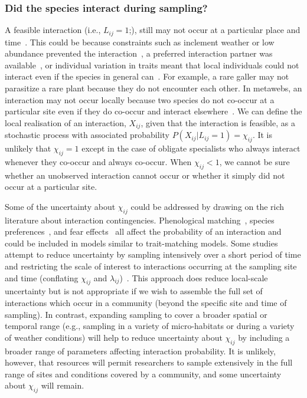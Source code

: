 \documentclass[12pt]{article}
\begin{document}
\begin{spacing}{2.0}
        \subsubsection*{Did the species interact during sampling?} 

          A feasible interaction (i.e., $L_{ij}=1$;), still may not occur at a particular place and time~\citep{Poisot2015,Graham2018}. This could be because constraints such as inclement weather or low abundance prevented the interaction~\citep{Jordano2016,Graham2018}, a preferred interaction partner was available~\citep{Weinstein2017a}, or individual variation in traits meant that local individuals could not interact even if the species in general can~\citep{Gravel2013,Wells2013,Poisot2015}. For example, a rare galler may not parasitize a rare plant because they do not encounter each other. In metawebs, an interaction may not occur locally because two species do not co-occur at a particular site even if they do co-occur and interact elsewhere~\citep{Graham2018}. We can define the local realisation of an interaction, $X_{ij}$, given that the interaction is feasible, as a stochastic process with associated probability $P(X_{ij}|L_{ij}=1)=\chi_{ij}$. It is unlikely that $\chi_{ij}=1$  except in the case of obligate specialists who always interact whenever they co-occur and always co-occur. When $\chi_{ij}<1$, we cannot be sure whether an unobserved interaction cannot occur or whether it simply did not occur at a particular site.


          Some of the uncertainty about $\chi_{ij}$ could be addressed by drawing on the rich literature about interaction contingencies. Phenological matching~\citep{MillerRushing2010}, species preferences~\citep{Pires2011a,Novak2015}, and fear effects~\citep{Luttbeg2005} all affect the probability of an interaction and could be included in models similar to trait-matching models. Some studies attempt to reduce uncertainty by sampling intensively over a short period of time and restricting the scale of interest to interactions occurring at the sampling site and time (conflating $\chi_{ij}$ and $\lambda_{ij}$)~\citep{Bartomeus2013,Weinstein2017,Weinstein2017a}. This approach does reduce local-scale uncertainty but is not appropriate if we wish to assemble the full set of interactions which occur in a community (beyond the specific site and time of sampling). In contrast, expanding sampling to cover a broader spatial or temporal range (e.g., sampling in a variety of micro-habitats or during a variety of weather conditions) will help to reduce uncertainty about $\chi_{ij}$ by including a broader range of parameters affecting interaction probability. It is unlikely, however, that resources will permit researchers to sample extensively in the full range of sites and conditions covered by a community, and some uncertainty about $\chi_{ij}$ will remain.


\end{spacing}
\end{document}

